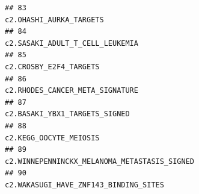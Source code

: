 \documentclass{article}\usepackage[]{graphicx}\usepackage[]{color}
\makeatletter
\newenvironment{kframe}{%
 \def\at@end@of@kframe{}%
 \ifinner\ifhmode%
  \def\at@end@of@kframe{\end{minipage}}%
  \begin{minipage}{\columnwidth}%
 \fi\fi%
 \def\FrameCommand##1{\hskip\@totalleftmargin \hskip-\fboxsep
 \colorbox{shadecolor}{##1}\hskip-\fboxsep
     \hskip-\linewidth \hskip-\@totalleftmargin \hskip\columnwidth}%
 \MakeFramed {\advance\hsize-\width
   \@totalleftmargin\z@ \linewidth\hsize
   \@setminipage}}%
 {\par\unskip\endMakeFramed%
 \at@end@of@kframe}
\newenvironment{knitrout}{}{} %
\makeatother
\begin{document}
\begin{knitrout}
\begin{kframe}
\begin{verbatim}
## 83                                                                                                                                                                                                                                                                                                                                c2.OHASHI_AURKA_TARGETS
## 84                                                                                                                                                                                                                                                                                                                        c2.SASAKI_ADULT_T_CELL_LEUKEMIA
## 85                                                                                                                                                                                                                                                                                                                                 c2.CROSBY_E2F4_TARGETS
## 86                                                                                                                                                                                                                                                                                                                        c2.RHODES_CANCER_META_SIGNATURE
## 87                                                                                                                                                                                                                                                                                                                          c2.BASAKI_YBX1_TARGETS_SIGNED
## 88                                                                                                                                                                                                                                                                                                                                 c2.KEGG_OOCYTE_MEIOSIS
## 89                                                                                                                                                                                                                                                                                                           c2.WINNEPENNINCKX_MELANOMA_METASTASIS_SIGNED
## 90                                                                                                                                                                                                                                                                                                                  c2.WAKASUGI_HAVE_ZNF143_BINDING_SITES

\end{verbatim}
\end{kframe}
\end{knitrout}
\end{document}
